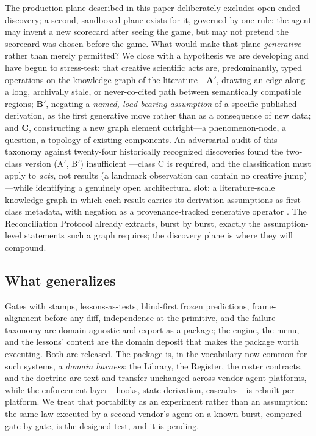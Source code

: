 \documentclass[twocolumn]{aastex631}
\begin{document}
The production plane described in this paper deliberately excludes open-ended
discovery; a second, sandboxed plane exists for it, governed by one rule:
the agent may invent a new scorecard after seeing the game, but may not
pretend the scorecard was chosen before the game. What would make that plane
\emph{generative} rather than merely permitted? We close with a hypothesis
we are developing and have begun to stress-test: that creative scientific
acts are, predominantly, typed operations on the knowledge graph of the
literature---\textbf{A$'$}, drawing an edge along a long, archivally stale,
or never-co-cited path between semantically compatible regions;
\textbf{B$'$}, negating a \emph{named, load-bearing assumption} of a
specific published derivation, as the first generative move rather than as a
consequence of new data; and \textbf{C}, constructing a new graph element
outright---a phenomenon-node, a question, a topology of existing components.
An adversarial audit of this taxonomy against twenty-four historically
recognized discoveries found the two-class version (A$'$, B$'$) insufficient
---class C is required, and the classification must apply to \emph{acts},
not results (a landmark observation can contain no creative jump)---while
identifying a genuinely open architectural slot: a literature-scale
knowledge graph in which each result carries its derivation assumptions as
first-class metadata, with negation as a provenance-tracked generative
operator \citep{boden2004,swanson1986,2013Sci...342..468U,2013arXiv1302.6906F,wiggins2006}. The
Reconciliation Protocol already extracts, burst by burst, exactly the
assumption-level statements such a graph requires; the discovery plane is
where they will compound.

\subsection{What generalizes}

Gates with stamps, lessons-as-tests, blind-first frozen predictions,
frame-alignment before any diff, independence-at-the-primitive, and the
failure taxonomy are domain-agnostic and export as a package; the engine,
the menu, and the lessons' content are the domain deposit that makes the
package worth executing. Both are released. The package is, in the
vocabulary now common for such systems, a \emph{domain harness}: the
Library, the Register, the roster contracts, and the doctrine are text
and transfer unchanged across vendor agent platforms, while the
enforcement layer---hooks, state derivation, cascades---is rebuilt per
platform. We treat that portability as an experiment rather than an
assumption: the same law executed by a second vendor's agent on a known
burst, compared gate by gate, is the designed test, and it is pending.
\end{document}
